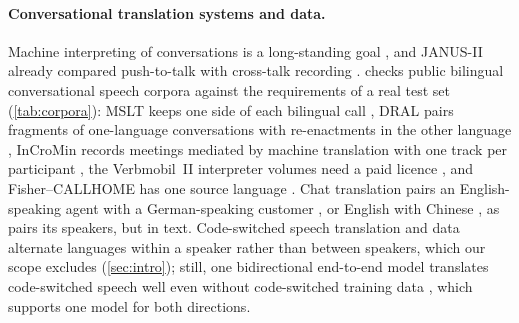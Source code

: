 \paragraph{Conversational translation systems and data.}
Machine interpreting of conversations is a long-standing goal \citep{waibel1996interactive,wahlster2000verbmobil,lewis2015skype}, and JANUS-II already compared push-to-talk with cross-talk recording \citep{lavie1996translation}.  checks public bilingual conversational speech corpora against the requirements of a real \task test set (\cref{tab:corpora}): MSLT keeps one side of each bilingual call \citep{federmann2016microsoft,federmann2017microsoft}, DRAL pairs fragments of one-language conversations with re-enactments in the other language \citep{ward2023dialogs,ward2024dialogs,avila2023towards}, InCroMin records meetings mediated by machine translation with one track per participant \citep{cechovic2025corpus}, the Verbmobil~II interpreter volumes need a paid licence \citep{bas2000verbmobil2}, and Fisher--CALLHOME has one source language \citep{post2013improved}. Chat translation pairs an English-speaking agent with a German-speaking customer \citep{farajian2020findings}, or English with Chinese \citep{liang2021modeling}, as \task pairs its speakers, but in text. Code-switched speech translation and data \citep{weller2022end,alastruey2023towards,hamed2022arzen,shankar2025costa,yan2025csfleurs,zhou2025csdialogue} alternate languages within a speaker rather than between speakers, which our scope excludes (\cref{sec:intro}); still, one bidirectional end-to-end model translates code-switched speech well even without code-switched training data \citep{weller2022end}, which supports one model for both directions.

